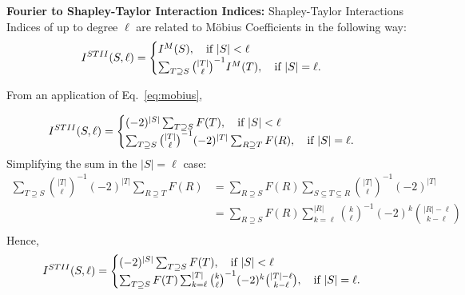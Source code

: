 \textbf{Fourier to Shapley-Taylor Interaction Indices:}
Shapley-Taylor Interactions Indices \cite{dhamdhere2019shapley} of up to degree $\ell$ are related to M\"obius Coefficients in the following way:
\begin{equation}
    I^{STII}(S,\ell) = \begin{cases}
I^M(S), \quad \textnormal{if } |S| < \ell\\
\sum_{T \supseteq S} \binom{|T|}{\ell}^{-1}I^M(T), \quad \textnormal{if } |S| = \ell.
\end{cases}
\end{equation}

From an application of Eq.~\ref{eq:mobius},

\begin{equation}
    I^{STII}(S,\ell) = \begin{cases}
(-2)^{|S|}\sum_{T\supseteq S}F(T), \quad \textnormal{if } |S| < \ell\\
\sum_{T \supseteq S} \binom{|T|}{\ell}^{-1}(-2)^{|T|}\sum_{R\supseteq T}F(R), \quad \textnormal{if } |S| = \ell.
\end{cases}
\end{equation}
Simplifying the sum in the $|S|=\ell$ case:
\begin{align}
    \sum_{T \supseteq S} \binom{|T|}{\ell}^{-1}(-2)^{|T|}\sum_{R\supseteq T}F(R) &= \sum_{R \supseteq S}F(R)\sum_{S\subseteq T\subseteq R}\binom{|T|}{\ell}^{-1}(-2)^{|T|}\\
    &= \sum_{R \supseteq S}F(R)\sum_{k = \ell}^{|R|}\binom{k}{\ell}^{-1}(-2)^{k}\binom{|R|-\ell}{k-\ell}\\
\end{align}
Hence, 
\begin{equation}
    I^{STII}(S,\ell) = \begin{cases}
(-2)^{|S|}\sum_{T\supseteq S}F(T), \quad \textnormal{if } |S| < \ell\\
\sum_{T \supseteq S}F(T)\sum_{k = \ell}^{|T|}\binom{k}{\ell}^{-1}(-2)^{k}\binom{|T|-\ell}{k-\ell}, \quad \textnormal{if } |S| = \ell.
\end{cases}
\end{equation}
